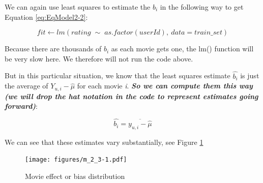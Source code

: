 \documentclass[
]{article}
\newenvironment{Shaded}{}{}
\newcommand{\AttributeTok}[1]{\textcolor[rgb]{0.49,0.56,0.16}{#1}}
\newcommand{\FunctionTok}[1]{\textcolor[rgb]{0.02,0.16,0.49}{#1}}
\newcommand{\NormalTok}[1]{#1}
\newcommand{\OtherTok}[1]{\textcolor[rgb]{0.00,0.44,0.13}{#1}}
\newcommand{\SpecialCharTok}[1]{\textcolor[rgb]{0.25,0.44,0.63}{#1}}
\begin{document}
We can again use least squares to estimate the \(b_{i}\) in the
following way to get Equation \ref{eq:EqModel2-2}:

%
\par

\label{eq:EqModel2-2} \begin{equation}
  fit \leftarrow lm(rating \; \sim \; as.factor(userId), \: data = train\_{}set)
\end{equation}

Because there are thousands of \(b_{i}\) as each movie gets one, the
lm() function will be very slow here. We therefore will not run the code
above.

But in this particular situation, we know that the least squares
estimate \(\hat{b_{i}}\) is just the average of \(Y_{u,i}-\hat{\mu}\)
for each movie \emph{i}. \textbf{\emph{So we can compute them this way
(we will drop the hat notation in the code to represent estimates going
forward)}}:

%
\par

\label{eq:EqModel2-3} \begin{equation}
  \hat{b_{i}} = \overline{y_{u,i} - \hat{\mu}}
\end{equation}

\begin{Shaded}
\end{Shaded}

\newpage

We can see that these estimates vary substantially, see Figure
\ref{fig:model_2}

\begin{figure}
\centering
\texttt{[image: figures/m\_2\_3-1.pdf]}
\caption{Movie effect or bias distribution\label{fig:model_2}}
\end{figure}
\end{document}
